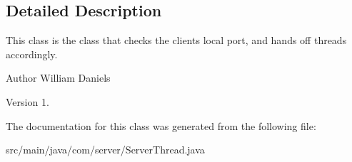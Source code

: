 \subsection{Detailed Description}
This class is the class that checks the clients local port, and hands off threads accordingly. 

\begin{DoxyAuthor}{Author}
William Daniels 
\end{DoxyAuthor}
\begin{DoxyVersion}{Version}
1. 
\end{DoxyVersion}


The documentation for this class was generated from the following file\-:\begin{DoxyCompactItemize}
\item 
src/main/java/com/server/Server\-Thread.\-java\end{DoxyCompactItemize}
